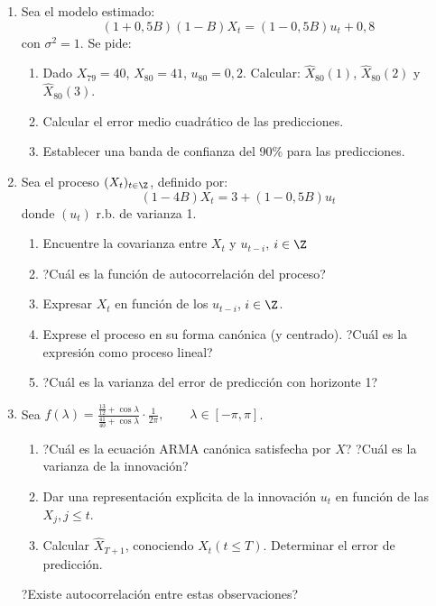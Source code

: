 \begin{enumerate}
\item Sea el modelo estimado:
\[
(1+0,5B)(1-B)X_{t} =(1-0,5B)u_{t} +0,8
\]
con $\sigma^{2}=1.$ Se pide:
\begin{enumerate}
\item Dado $X_{79}= 40$, $X_{80}=41$, $u_{80} =0,2$. Calcular: $\widehat{X}_{80} (1)$, $\widehat{X}_{80} (2)$ y $\widehat{X}_{80} (3)$.
\item Calcular el error medio cuadr\'{a}tico de las predicciones.
\item Establecer una banda de confianza del 90{\%} para las predicciones.
\end{enumerate}

\item Sea el proceso $(X_{t})_{t\in \Z} $, definido por:
\[
(1-4B)X_{t} =3+(1-0,5B)u_{t} 
\]
donde $(u_{t})$ r.b. de varianza 1.

\begin{enumerate}
\item Encuentre la covarianza entre $X_{t}$ y $u_{t-i}$, $i\in \Z$
\item ?Cu\'{a}l es la funci\'{o}n de autocorrelaci\'{o}n del proceso?
\item Expresar $X_{t}$ en funci\'{o}n de los $u_{t-i}$, $i\in \Z$. 
\item Exprese el proceso en su forma can\'{o}nica (y centrado). ?Cu\'{a}l es la expresi\'{o}n como proceso lineal?
\item ?Cu\'{a}l es la varianza del error de predicci\'{o}n con horizonte 1?
\end{enumerate}	

\item Sea $\displaystyle f(\lambda )=\frac{\frac{13}{12}+\cos \lambda }{\frac{41}{40}+\cos \lambda}\cdot\frac{1}{2\pi },\qquad \lambda \in [-\pi ,\pi]$.

\begin{enumerate}
\item ?Cu\'{a}l es la ecuaci\'{o}n ARMA can\'{o}nica satisfecha por $X$? ?Cu\'{a}l es la varianza de la innovaci\'{o}n?
\item Dar una representaci\'{o}n expl\'{\i}cita de la innovaci\'{o}n $u_{t} $ en funci\'{o}n de las $X_{j} ,j\le t$. 
\item Calcular $\widehat{X}_{T+1} $, conociendo $X_{t} \left( {t\le T} \right)$. Determinar el error de predicci\'{o}n.
\end{enumerate}

?Existe autocorrelaci\'{o}n entre estas observaciones?


\end{enumerate}

